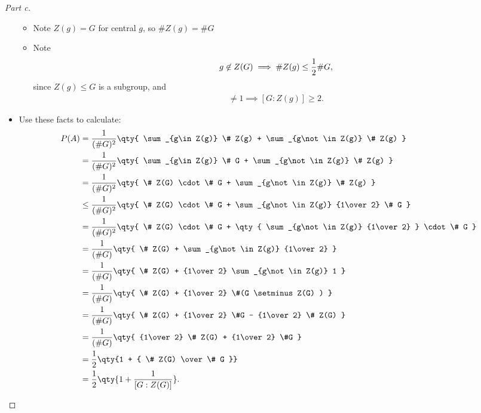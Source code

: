 \begin{solution}
\begin{proof}[Part c]
\begin{itemize}
  \begin{itemize}
  \tightlist
  \item
    Note \(Z(g) = G\) for central \(g\), so \(\# Z(g) = \# G\)
  \item
    Note
    \begin{align*}
    g\not\in Z(G)\implies \# Z(g) \leq {1\over 2} \# G
    ,\end{align*}
    since \(Z(g) \leq G\) is a subgroup, and
    \begin{align*}
    [G:Z(g)] \neq 1 \implies [G: Z(g)] \geq 2
    .\end{align*}
  \end{itemize}
\item
  Use these facts to calculate:
  \begin{align*}
  P(A) 
  &= {1\over (\# G)^2 } \qty{ \sum_{g\in Z(g)} \# Z(g) + \sum_{g\not\in Z(g)} \# Z(g) } \\
  &= {1\over (\# G)^2 } \qty{ \sum_{g\in Z(g)} \# G + \sum_{g\not\in Z(g)} \# Z(g) } \\
  &= {1\over (\# G)^2 } \qty{ \# Z(G) \cdot \# G + \sum_{g\not\in Z(g)} \# Z(g) } \\
  &\leq {1\over (\# G)^2 } \qty{ \# Z(G) \cdot \# G + \sum_{g\not\in Z(g)} {1\over 2} \# G } \\
  &= {1\over (\# G)^2 } \qty{ \# Z(G) \cdot \# G + \qty{ \sum_{g\not\in Z(g)} {1\over 2} } \cdot \# G } \\
  &= {1\over (\# G) } \qty{ \# Z(G) + \sum_{g\not\in Z(g)} {1\over 2} } \\
  &= {1\over (\# G) } \qty{ \# Z(G) + {1\over 2} \sum_{g\not\in Z(g)} 1 } \\
  &= {1\over (\# G) } \qty{ \# Z(G) + {1\over 2} \#(G \setminus Z(G) ) } \\
  &= {1\over (\# G) } \qty{ \# Z(G) + {1\over 2} \#G - {1\over 2} \# Z(G) } \\
  &= {1\over (\# G) } \qty{ {1\over 2} \# Z(G) + {1\over 2} \#G  } \\
  &= {1\over 2} \qty{1 + { \# Z(G) \over \# G }} \\
  &= {1\over 2} \qty{1 + { 1 \over [G : Z(G)]  }}
  .\end{align*}
\end{itemize}

\end{proof}


\end{solution}


